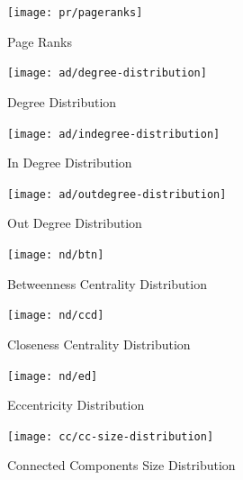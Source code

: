 \documentclass[paper=a4, fontsize=11pt]{scrartcl} %
\numberwithin{equation}{section} %
\numberwithin{figure}{section} %
\numberwithin{table}{section} %
\begin{document}
\begin{figure}[H]
\texttt{[image: pr/pageranks]}
\caption{Page Ranks}
\label{fig:pr}
\end{figure}

\begin{figure}[H]
\texttt{[image: ad/degree-distribution]}
\caption{Degree Distribution}
\label{fig:degree-dist}
\end{figure}

\begin{figure}[H]
\texttt{[image: ad/indegree-distribution]}
\caption{In Degree Distribution}
\label{fig:indegree-dist}
\end{figure}

\begin{figure}[H]
\texttt{[image: ad/outdegree-distribution]}
\caption{Out Degree Distribution}
\label{fig:outdegree-dist}
\end{figure}

\begin{figure}[H]
\texttt{[image: nd/btn]}
\caption{Betweenness Centrality Distribution}
\label{fig:bcd}
\end{figure}

\begin{figure}[H]
\texttt{[image: nd/ccd]}
\caption{Closeness Centrality Distribution}
\label{fig:ccd}
\end{figure}

\begin{figure}[H]
\texttt{[image: nd/ed]}
\caption{Eccentricity Distribution}
\label{fig:ed}
\end{figure}

\begin{figure}[H]
\texttt{[image: cc/cc-size-distribution]}
\caption{Connected Components Size Distribution}
\label{fig:cc}
\end{figure}

\newpage

{}

\end{document}
